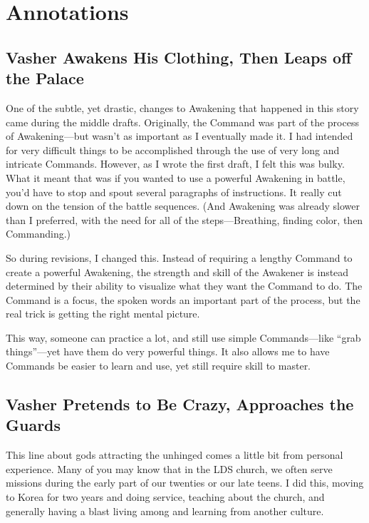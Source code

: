 \section*{Annotations}

\subsection*{Vasher Awakens His Clothing, Then Leaps off the Palace}

One of the subtle, yet drastic, changes to Awakening that happened in this story came during the middle drafts. Originally, the Command was part of the process of Awakening—but wasn’t as important as I eventually made it. I had intended for very difficult things to be accomplished through the use of very long and intricate Commands. However, as I wrote the first draft, I felt this was bulky. What it meant that was if you wanted to use a powerful Awakening in battle, you’d have to stop and spout several paragraphs of instructions. It really cut down on the tension of the battle sequences. (And Awakening was already slower than I preferred, with the need for all of the steps—Breathing, finding color, then Commanding.)

So during revisions, I changed this. Instead of requiring a lengthy Command to create a powerful Awakening, the strength and skill of the Awakener is instead determined by their ability to visualize what they want the Command to do. The Command is a focus, the spoken words an important part of the process, but the real trick is getting the right mental picture.

This way, someone can practice a lot, and still use simple Commands—like “grab things”—yet have them do very powerful things. It also allows me to have Commands be easier to learn and use, yet still require skill to master.

\subsection*{Vasher Pretends to Be Crazy, Approaches the Guards}

This line about gods attracting the unhinged comes a little bit from personal experience. Many of you may know that in the LDS church, we often serve missions during the early part of our twenties or our late teens. I did this, moving to Korea for two years and doing service, teaching about the church, and generally having a blast living among and learning from another culture.

